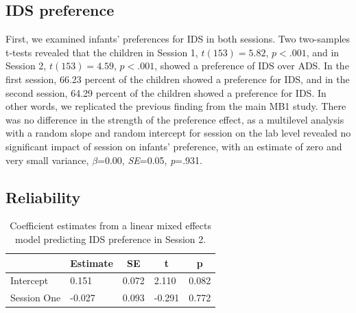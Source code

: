 \documentclass[
  english,
  man,floatsintext]{apa6}
\begin{document}
\hypertarget{ids-preference}{%
\subsection{IDS preference}\label{ids-preference}}

First, we examined infants' preferences for IDS in both sessions. Two two-samples t-tests revealed that the children in Session 1, \(t(153) = 5.82\), \(p < .001\), and in Session 2, \(t(153) = 4.59\), \(p < .001\), showed a preference of IDS over ADS. In the first session, 66.23 percent of the children showed a preference for IDS, and in the second session, 64.29 percent of the children showed a preference for IDS. In other words, we replicated the previous finding from the main MB1 study. There was no difference in the strength of the preference effect, as a multilevel analysis with a random slope and random intercept for session on the lab level revealed no significant impact of session on infants' preference, with an estimate of zero and very small variance, \(\beta\)=0.00, \emph{SE}=0.05, \emph{p}=.931.

\hypertarget{reliability}{%
\subsection{Reliability}\label{reliability}}

\begin{table}[tbp]

\begin{center}
\begin{threeparttable}

\caption{\label{tab:coef_table2}Coefficient estimates from a linear mixed effects model predicting IDS preference in Session 2.}

\begin{tabular}{lllll}
\toprule
 & \multicolumn{1}{c}{Estimate} & \multicolumn{1}{c}{SE} & \multicolumn{1}{c}{t} & \multicolumn{1}{c}{p}\\
\midrule
Intercept & 0.151 & 0.072 & 2.110 & 0.082\\
Session One & -0.027 & 0.093 & -0.291 & 0.772\\
\bottomrule
\end{tabular}

\end{threeparttable}
\end{center}

\end{table}
\end{document}
